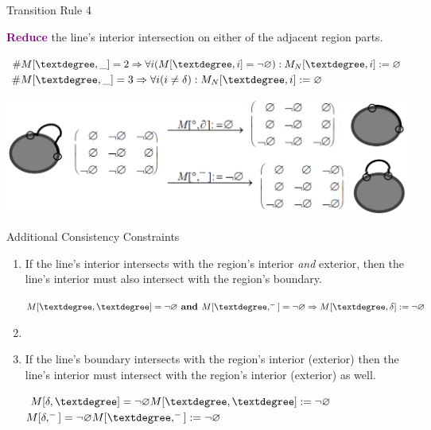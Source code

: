	\begin{frame}{Transition Rule 4}
		\begin{block}{}
			\textcolor{purple}{\textbf{Reduce}} the line's interior intersection on either of the adjacent region parts.
		\end{block}
		\begin{block}{}
			\centering
			$ \#M[\textdegree, \_] = 2 \Rightarrow
			\forall i (M[\textdegree, i] = \NotEmpty):
			M_{N}[\textdegree, i] := \Empty $
			$ \#M[\textdegree, \_] = 3 \Rightarrow
			\forall i (i \neq \delta):
			M_{N}[\textdegree, i] := \Empty $
		\end{block}
		\begin{block}{}
			\includegraphics[width=\textwidth]{images/smooth_transitions_example_d.png}
		\end{block}
	\end{frame}
	
	\begin{frame}{Additional Consistency Constraints}
		\begin{enumerate}
			\item If the line's interior intersects with the region's interior \textit{and} exterior, then the line's interior must also intersect with the region's boundary.
			\\ \vspace{6pt}
			\begin{center}
				$ M[\textdegree,\textdegree] = \NotEmpty \text{\textbf{ and }} M[\textdegree,^{-}] = \NotEmpty \Rightarrow M[\textdegree,\delta] := \NotEmpty $
			\end{center}
			\item[ ]
			\item If the line's boundary intersects with the region's interior (exterior) then the line's interior must intersect with the region's interior (exterior) as well.
			\\ \vspace{6pt}
			\begin{center}
				$ M[\delta,\textdegree] = \NotEmpty M[\textdegree,\textdegree] := \NotEmpty $ \\
				$ M[\delta, ^{-}] = \NotEmpty M[\textdegree,^{-}] := \NotEmpty $
			\end{center}
		\end{enumerate}
		
	\end{frame}
	
